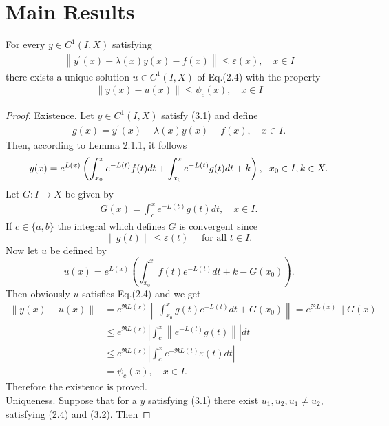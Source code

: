 \documentclass[a4paper,12pt]{report}
\begin{document}
\chapter{Main Results}	
\begin{thm}
For every $y \in C^{1}(I, X)$ satisfying
\begin{eqnarray}
	\left\|y^{\prime}(x)-\lambda(x) y(x)-f(x)\right\| \le \varepsilon(x), \quad x \in I
\end{eqnarray}
there exists a unique solution $u \in C^{1}(I, X)$ of Eq.(2.4) with  the \linebreak property
\begin{eqnarray}
	\|y(x)-u(x)\| \le \psi_{c}(x), \quad x \in I
\end{eqnarray}
\begin{proof}
	 Existence. Let $y \in C^{1}(I, X)$ satisfy (3.1) and define
	 \begin{eqnarray}
	 	g(x)=y^{\prime}(x)-\lambda(x) y(x)-f(x), \quad x \in I.
	 	\end{eqnarray}
 	Then, according to Lemma 2.1.1, it follows
 	$$ y(x)=e^{L(x)}\left(\int_{x_{0}}^{x} e^{-L(t)} f(t) d t+\int_{x_{0}}^{x} e^{-L(t)} g(t) d t+k\right),\hspace{0.2cm} x_{0} \in I, k \in X . $$
 	Let $G: I \rightarrow X$ be given by
 	\begin{eqnarray}
 		 G(x)=\int_{c}^{x} e^{-L(t)} g(t) d t, \quad x \in I.
 	\end{eqnarray}
 If $c \in\{a, b\}$ the integral which defines $G$ is convergent since
 $$ \|g(t)\| \le \varepsilon(t) \quad \text { for all } t \in I . $$
 Now let $u$ be defined by
 $$u(x)=e^{L(x)}\left(\int_{x_{0}}^{x} f(t) e^{-L(t)} d t+k-G\left(x_{0}\right)\right) .
 $$
 Then obviously $u$ satisfies Eq.(2.4) and we get
 $$
 \begin{aligned}
 	\|y(x)-u(x)\| & =e^{\Re L(x)}\left\|\int_{x_{0}}^{x} g(t) e^{-L(t)} d t+G\left(x_{0}\right)\right\|=e^{\Re L(x)}\|G(x)\| \\
 	& \le e^{\Re L(x)}\left|\int_{c}^{x}\left\|e^{-L(t)} g(t)\right\|\right| d t \\
 	& \le e^{\Re L(x)}\left|\int_{c}^{x} e^{-\Re L(t)} \varepsilon(t) d t\right| \\
 	& =\psi_{c}(x), \quad x \in I .
 \end{aligned}
 $$
 Therefore the existence is proved. \\
 Uniqueness. Suppose that for a $y$ satisfying (3.1) there exist \linebreak $u_{1}, u_{2}, u_{1} \neq u_{2}$, satisfying (2.4) and (3.2). Then

\end{proof}
\end{thm}
\end{document}
